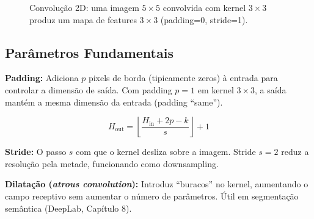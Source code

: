 \begin{figure}[H]
  \centering
  \caption{Convolução 2D: uma imagem $5 \times 5$ convolvida com kernel $3 \times 3$
  produz um mapa de features $3 \times 3$ (padding=0, stride=1).}
  \label{fig:conv-2d-demo}
\end{figure}

\subsection{Parâmetros Fundamentais}

\textbf{Padding:} Adiciona $p$ pixels de borda (tipicamente zeros) à entrada
para controlar a dimensão de saída. Com padding $p=1$ em kernel $3\times3$, a
saída mantém a mesma dimensão da entrada (padding ``same'').

\begin{equation}
  H_{\text{out}} = \left\lfloor \frac{H_{\text{in}} + 2p - k}{s} \right\rfloor + 1
  \label{eq:conv-output-size}
\end{equation}

\textbf{Stride:} O passo $s$ com que o kernel desliza sobre a imagem. Stride $s=2$
reduz a resolução pela metade, funcionando como downsampling.

\textbf{Dilatação (\textit{atrous convolution}):} Introduz ``buracos'' no kernel,
aumentando o campo receptivo sem aumentar o número de parâmetros. Útil em
segmentação semântica (DeepLab, Capítulo 8).

